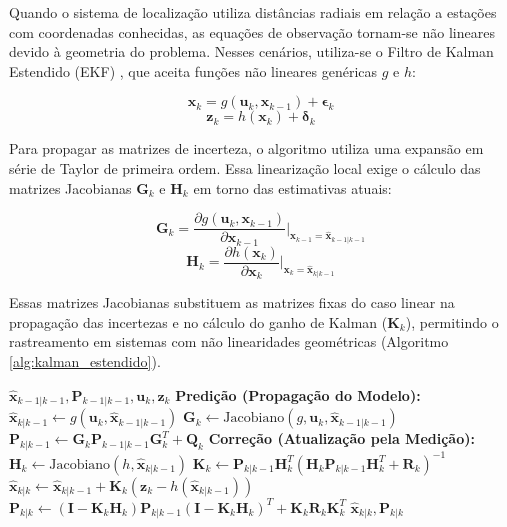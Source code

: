 Quando o sistema de localização utiliza distâncias radiais em relação a estações com coordenadas conhecidas, as equações de observação tornam-se não lineares devido à geometria do problema. Nesses cenários, utiliza-se o Filtro de Kalman Estendido (EKF) \cite{thrun2005probabilistic}, que aceita funções não lineares genéricas $g$ e $h$:

\begin{equation}
    \label{eq:ekf_dinamica}
    \mathbf{x}_k = g(\mathbf{u}_k, \mathbf{x}_{k-1}) + \boldsymbol{\epsilon}_k
\end{equation}
\begin{equation}
    \label{eq:ekf_medicao}
    \mathbf{z}_k = h(\mathbf{x}_k) + \boldsymbol{\delta}_k
\end{equation}

Para propagar as matrizes de incerteza, o algoritmo utiliza uma expansão em série de Taylor de primeira ordem. Essa linearização local exige o cálculo das matrizes Jacobianas $\mathbf{G}_k$ e $\mathbf{H}_k$ em torno das estimativas atuais:

\begin{equation}
    \label{eq:jacobiano_G}
    \mathbf{G}_k = \frac{\partial g(\mathbf{u}_k, \mathbf{x}_{k-1})}{\partial \mathbf{x}_{k-1}} \Bigg|_{\mathbf{x}_{k-1} = \hat{\mathbf{x}}_{k-1|k-1}} 
\end{equation}
\begin{equation}
    \label{eq:jacobiano_H}
    \mathbf{H}_k = \frac{\partial h(\mathbf{x}_k)}{\partial \mathbf{x}_k} \Bigg|_{\mathbf{x}_k = \hat{\mathbf{x}}_{k|k-1}}
\end{equation}

Essas matrizes Jacobianas substituem as matrizes fixas do caso linear na propagação das incertezas e no cálculo do ganho de Kalman ($\mathbf{K}_k$), permitindo o rastreamento em sistemas com não linearidades geométricas (Algoritmo \ref{alg:kalman_estendido}).

\begin{algorithm}[H]
\caption{Filtro de Kalman Estendido (EKF)}
\label{alg:kalman_estendido}
\begin{algorithmic}[1]
\Require $\hat{\mathbf{x}}_{k-1|k-1}, \mathbf{P}_{k-1|k-1}, \mathbf{u}_k, \mathbf{z}_k$
\Statex \textbf{Predição (Propagação do Modelo):}
\State $\hat{\mathbf{x}}_{k|k-1} \gets g(\mathbf{u}_k, \hat{\mathbf{x}}_{k-1|k-1})$
\State $\mathbf{G}_k \gets \text{Jacobiano}(g, \mathbf{u}_k, \hat{\mathbf{x}}_{k-1|k-1})$
\State $\mathbf{P}_{k|k-1} \gets \mathbf{G}_k \mathbf{P}_{k-1|k-1} \mathbf{G}_k^T + \mathbf{Q}_k$
\Statex \textbf{Correção (Atualização pela Medição):}
\State $\mathbf{H}_k \gets \text{Jacobiano}(h, \hat{\mathbf{x}}_{k|k-1})$
\State $\mathbf{K}_k \gets \mathbf{P}_{k|k-1} \mathbf{H}_k^T (\mathbf{H}_k \mathbf{P}_{k|k-1} \mathbf{H}_k^T + \mathbf{R}_k)^{-1}$
\State $\hat{\mathbf{x}}_{k|k} \gets \hat{\mathbf{x}}_{k|k-1} + \mathbf{K}_k (\mathbf{z}_k - h(\hat{\mathbf{x}}_{k|k-1}))$
\State $\mathbf{P}_{k|k} \gets (\mathbf{I} - \mathbf{K}_k \mathbf{H}_k) \mathbf{P}_{k|k-1} (\mathbf{I} - \mathbf{K}_k \mathbf{H}_k)^T + \mathbf{K}_k \mathbf{R}_k \mathbf{K}_k^T$
\Ensure $\hat{\mathbf{x}}_{k|k}, \mathbf{P}_{k|k}$
\end{algorithmic}
\end{algorithm}

